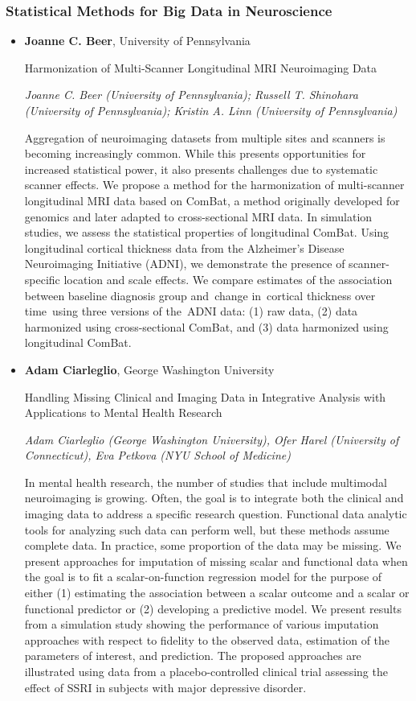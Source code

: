 \subsubsection*{Statistical Methods for Big Data in Neuroscience}

\begin{itemize}
\item \textbf{Joanne C. Beer}, University of Pennsylvania

Harmonization of Multi-Scanner Longitudinal MRI Neuroimaging Data

\emph{\footnotesize Joanne C. Beer (University of Pennsylvania); Russell T. Shinohara (University of Pennsylvania); Kristin A. Linn (University of Pennsylvania)}

Aggregation of neuroimaging datasets from multiple sites and scanners is becoming increasingly common. While this presents opportunities for increased statistical power, it also presents challenges due to systematic scanner effects. We propose a method for the harmonization of multi-scanner longitudinal MRI data based on ComBat, a method originally developed for genomics and later adapted to cross-sectional MRI data. In simulation studies, we assess the statistical properties of longitudinal ComBat. Using longitudinal cortical thickness data from the Alzheimer’s Disease Neuroimaging Initiative (ADNI), we demonstrate the presence of scanner-specific location and scale effects. We compare estimates of the association between baseline diagnosis group and change in cortical thickness over time using three versions of the ADNI data: (1) raw data, (2) data harmonized using cross-sectional ComBat, and (3) data harmonized using longitudinal ComBat.

\item \textbf{Adam Ciarleglio}, George Washington University

Handling Missing Clinical and Imaging Data in Integrative Analysis with Applications to Mental Health Research

\emph{\footnotesize Adam Ciarleglio (George Washington University), Ofer Harel (University of Connecticut), Eva Petkova (NYU School of Medicine)}

In mental health research, the number of studies that include multimodal neuroimaging is growing.  Often, the goal is to integrate both the clinical and imaging data to address a specific research question.  Functional data analytic tools for analyzing such data can perform well, but these methods assume complete data.  In practice, some proportion of the data may be missing.  We present approaches for imputation of missing scalar and functional data when the goal is to fit a scalar-on-function regression model for the purpose of either (1) estimating the association between a scalar outcome and a scalar or functional predictor or (2) developing a predictive model.  We present results from a simulation study showing the performance of various imputation approaches with respect to fidelity to the observed data, estimation of the parameters of interest, and prediction.  The proposed approaches are illustrated using data from a placebo-controlled clinical trial assessing the effect of SSRI in subjects with major depressive disorder.


\end{itemize}
